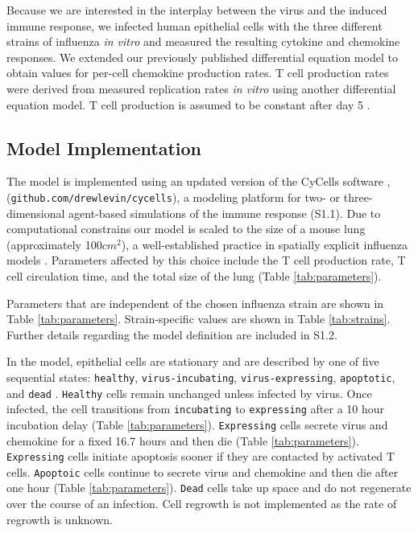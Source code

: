 \documentclass[preprint,10pt,numbers]{elsarticle}
\begin{document}
Because we are interested in the interplay between the virus and the induced immune response, we infected human epithelial cells with the three different strains of influenza \textit{in vitro} and measured the resulting cytokine and chemokine responses.  We extended our previously published differential equation model \citep{Mitchell2011} to obtain values for per-cell chemokine production rates.  T cell production rates were derived from measured replication rates \textit{in vitro} \citep{Miao2010a} using another differential equation model. T cell production is assumed to be constant after day 5 \citep{MartIn-Fontecha2003}.  

\subsection*{Model Implementation}

The model is implemented using an updated version of the CyCells software \citep{Warrender2006},
(\texttt{github.com/drewlevin/cycells}),
a modeling platform for two- or three-dimensional agent-based simulations of the immune response (S1.1).  Due to computational constrains our model is scaled to the size of a mouse lung (approximately 100$cm^2$), a well-established practice in spatially explicit influenza models \citep{Miller2003, Allan2006, Ingulli2009}.  Parameters affected by this choice include the T cell production rate, T cell circulation time, and the total size of the lung (Table \ref{tab:parameters}).

Parameters that are independent of the chosen influenza strain are shown in Table \ref{tab:parameters}.  Strain-specific values are shown in Table \ref{tab:strains}.  Further details regarding the model definition are included in S1.2.

In the model, epithelial cells are stationary and are described by one of five sequential states: \texttt{healthy}, \texttt{virus-incubating}, \texttt{virus-expressing}, \texttt{apoptotic}, and \texttt{dead} \citep{bachem1996simulated, Beauchemin2005, Mitchell2011}. \texttt{Healthy} cells remain unchanged unless infected by virus. Once infected, the cell transitions from \texttt{incubating} to \texttt{expressing} after a 10 hour incubation delay (Table \ref{tab:parameters}). \texttt{Expressing} cells secrete virus and chemokine for a fixed 16.7 hours and then die (Table \ref{tab:parameters}). \texttt{Expressing} cells initiate apoptosis sooner if they are contacted by activated T cells. \texttt{Apoptoic} cells continue to secrete virus and chemokine and then die after one hour (Table \ref{tab:parameters}). \texttt{Dead} cells take up space and do not regenerate over the course of an infection.  Cell regrowth is not implemented as the rate of regrowth is unknown. 
\end{document}
